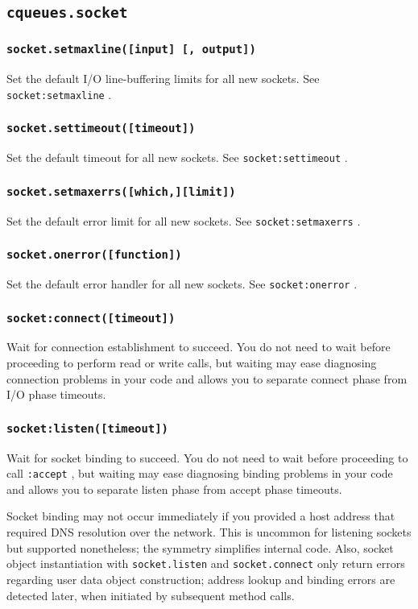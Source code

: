\documentclass[11pt, oneside]{memoir}
\newcommand{\fn}[1]{\texttt{#1} }
\newcounter{toccols}
\newenvironment{Module}[1]{
	\subsection{\texttt{#1}}
	\addtocontents{toc}{
		\protect\begin{multicols}{\value{toccols}}
	}
}{
	\addtocontents{toc}{\protect\end{multicols}}
}
\begin{document}
\begin{Module}{cqueues.socket}
\subsubsection[\fn{socket.setmaxline}]{\fn{socket.setmaxline([input] [, output])}}
	Set the default I/O line-buffering limits for all new sockets. See \fn{socket:setmaxline}.

\subsubsection[\fn{socket.settimeout}]{\fn{socket.settimeout([timeout])}}
	Set the default timeout for all new sockets. See \fn{socket:settimeout}.

\subsubsection[\fn{socket.setmaxerrs}]{\fn{socket.setmaxerrs([which,][limit])}}
	Set the default error limit for all new sockets. See \fn{socket:setmaxerrs}.

\subsubsection[\fn{socket.onerror}]{\fn{socket.onerror([function])}}
	Set the default error handler for all new sockets. See \fn{socket:onerror}.

\subsubsection[\fn{socket:connect}]{\fn{socket:connect([timeout])}}
Wait for connection establishment to succeed. You do not need to wait before proceeding to perform
read or write calls, but waiting may ease diagnosing connection problems in your code and allows you to separate connect phase from I/O phase timeouts.

\subsubsection[\fn{socket:listen}]{\fn{socket:listen([timeout])}}
Wait for socket binding to succeed. You do not need to wait before proceeding to call \fn{:accept}, but waiting may ease diagnosing binding problems in your code and allows you to separate listen phase from accept phase timeouts.

Socket binding may not occur immediately if you provided a host address that required DNS resolution over the network. This is uncommon for listening sockets but supported nonetheless; the symmetry simplifies internal code. Also, socket object instantiation with \fn{socket.listen} and \fn{socket.connect} only return errors regarding user data object construction; address lookup and binding errors are detected later, when initiated by subsequent method calls.


\end{Module}
\end{document}
